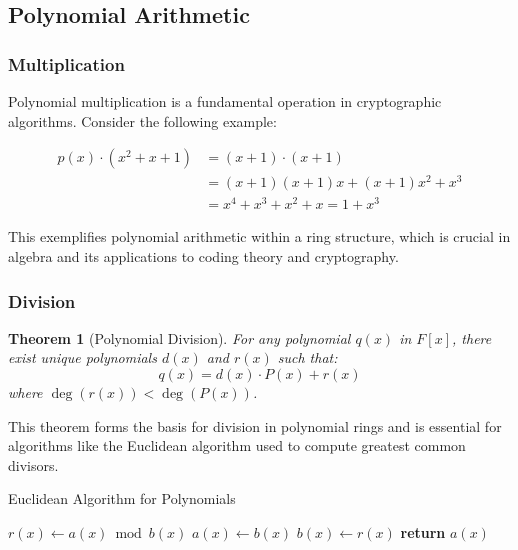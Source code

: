 \documentclass[11pt]{article}
\newtheorem{theorem}{Theorem}
\begin{document}
\subsection{Polynomial Arithmetic}

\subsubsection{Multiplication}

Polynomial multiplication is a fundamental operation in cryptographic algorithms. Consider the following example:

\begin{equation*}
    \begin{split}
        p(x) \cdot (x^2 + x + 1) &= (x + 1) \cdot (x + 1) \\
        &= (x + 1)(x + 1)x + (x + 1)x^2 + x^3 \\
        &= x^4 + x^3 + x^2 + x = 1 + x^3
    \end{split}
\end{equation*}

This exemplifies polynomial arithmetic within a ring structure, which is crucial in algebra and its applications to coding theory and cryptography.

\subsubsection{Division}

\begin{theorem}[Polynomial Division]
For any polynomial $q(x)$ in $F[x]$, there exist unique polynomials $d(x)$ and $r(x)$ such that:
\[ q(x) = d(x) \cdot P(x) + r(x) \]
where $\deg(r(x)) < \deg(P(x))$.
\end{theorem}

This theorem forms the basis for division in polynomial rings and is essential for algorithms like the Euclidean algorithm used to compute greatest common divisors.

\begin{algorithm}
\caption{Euclidean Algorithm for Polynomials}
\begin{algorithmic}[1]
        \State $r(x) \gets a(x) \bmod b(x)$
        \State $a(x) \gets b(x)$
        \State $b(x) \gets r(x)$
    \EndWhile
    \State \textbf{return} $a(x)$
\EndProcedure
\end{algorithmic}
\end{algorithm}
\end{document}
